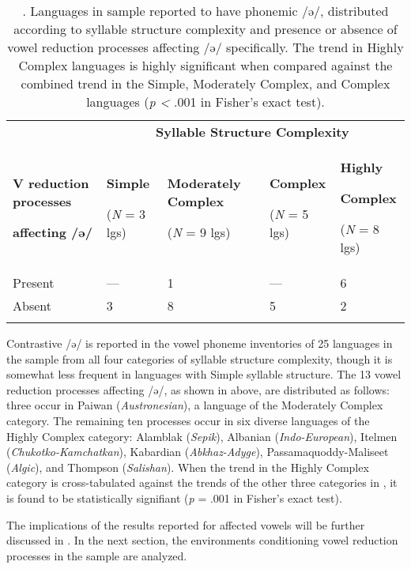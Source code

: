 \begin{table}
\begin{tabularx}{\textwidth}{XXXXX}
\lsptoprule
 & \multicolumn{4}{c}{ \textbf{Syllable Structure Complexity}}\\
{ \textbf{V reduction processes} }

 \textbf{affecting /ə/} & { \textbf{Simple}}

 (\textit{N} = 3 lgs) & { \textbf{Moderately Complex}}

 (\textit{N} = 9 lgs) & { \textbf{Complex}}

 (\textit{N} = 5 lgs) & { \textbf{Highly} }

{ \textbf{Complex}}

 (\textit{N} = 8 lgs)\\
 Present & — & 1 & — & 6\\
 Absent & 3 & 8 & 5 & 2\\
\lspbottomrule
\end{tabularx}
\caption{\label{tab:6.5}. Languages in sample reported to have phonemic /ə/, distributed according to syllable structure complexity and presence or absence of vowel reduction processes affecting /ə/ specifically. The trend in Highly Complex languages is highly significant when compared against the combined trend in the Simple, Moderately Complex, and Complex languages (\textit{p <} .001 in Fisher’s exact test).}
\end{table}

  Contrastive /ə/ is reported in the vowel phoneme inventories of 25 languages in the sample from all four categories of syllable structure complexity, though it is somewhat less frequent in languages with Simple syllable structure. The 13 vowel reduction processes affecting /ə/, as shown in  above, are distributed as follows: three occur in Paiwan (\textit{Austronesian}), a language of the Moderately Complex category. The remaining ten processes occur in six diverse languages of the Highly Complex category: Alamblak (\textit{Sepik}), Albanian (\textit{Indo-European}), Itelmen (\textit{Chukotko-Kamchatkan}), Kabardian (\textit{Abkhaz-Adyge}), Passamaquoddy-Maliseet (\textit{Algic}), and Thompson (\textit{Salishan}). When the trend in the Highly Complex category is cross-tabulated against the trends of the other three categories in , it is found to be statistically signifiant (\textit{p} = .001 in Fisher’s exact test).

  The implications of the results reported for affected vowels will be further discussed in . In the next section, the environments conditioning vowel reduction processes in the sample are analyzed.

